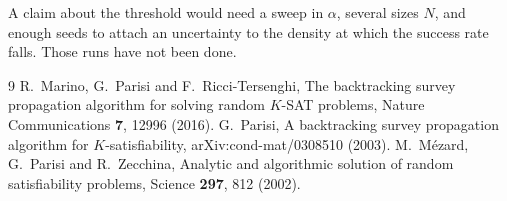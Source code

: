 \documentclass[11pt]{article}
\begin{document}
A claim about the threshold would need a sweep in $\alpha$, several sizes $N$, and enough seeds to attach an uncertainty to the density at which the success rate falls. Those runs have not been done.

\begin{thebibliography}{9}
R.~Marino, G.~Parisi and F.~Ricci-Tersenghi,
The backtracking survey propagation algorithm for solving random $K$-SAT problems,
Nature Communications \textbf{7}, 12996 (2016).
G.~Parisi,
A backtracking survey propagation algorithm for $K$-satisfiability,
arXiv:cond-mat/0308510 (2003).
M.~M\'ezard, G.~Parisi and R.~Zecchina,
Analytic and algorithmic solution of random satisfiability problems,
Science \textbf{297}, 812 (2002).
\end{thebibliography}
\end{document}
